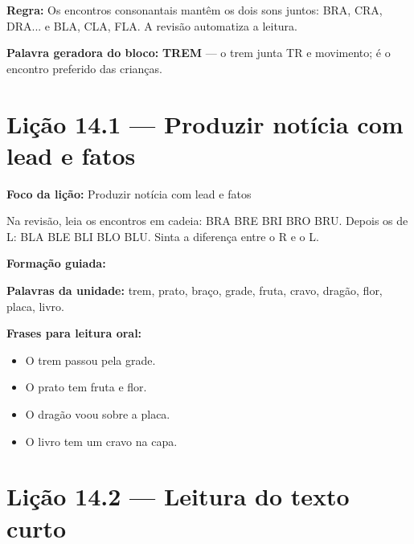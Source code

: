 \textbf{Regra:} Os encontros consonantais mantêm os dois sons juntos: BRA, CRA, DRA... e BLA, CLA, FLA. A revisão automatiza a leitura.

\textbf{Palavra geradora do bloco:} \textbf{TREM} --- o trem junta TR e movimento; é o encontro preferido das crianças.

\section{Lição 14.1 --- Produzir notícia com lead e fatos}

\textbf{Foco da lição:} Produzir notícia com lead e fatos


\begin{boquinha}
Na revisão, leia os encontros em cadeia: BRA BRE BRI BRO BRU. Depois os de L: BLA BLE BLI BLO BLU. Sinta a diferença entre o R e o L.
\end{boquinha}

\noindent\textbf{Formação guiada:}

\begin{center}
\end{center}

\noindent\textbf{Palavras da unidade:} trem, prato, braço, grade, fruta, cravo, dragão, flor, placa, livro.

\noindent\textbf{Frases para leitura oral:}
\begin{itemize}[leftmargin=1.6em]
  \item O trem passou pela grade.
  \item O prato tem fruta e flor.
  \item O dragão voou sobre a placa.
  \item O livro tem um cravo na capa.
\end{itemize}

\section{Lição 14.2 --- Leitura do texto curto}

